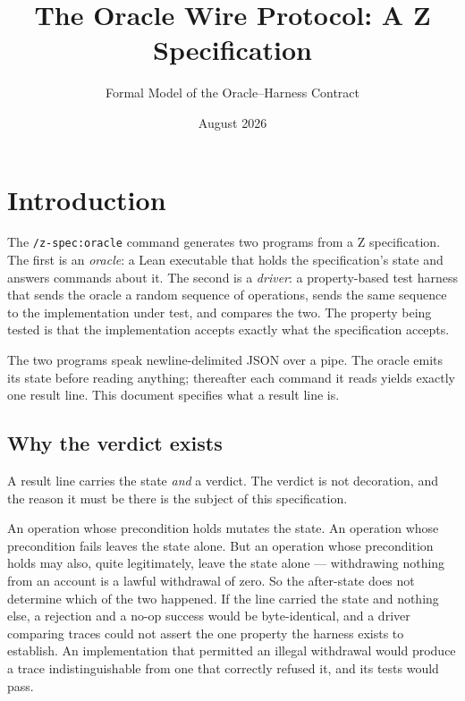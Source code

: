 \documentclass[a4paper,10pt,fleqn]{article}
\begin{document}
\title{The Oracle Wire Protocol: A Z Specification}
\author{Formal Model of the Oracle--Harness Contract}
\date{August 2026}
\maketitle

\tableofcontents
\newpage

\section{Introduction}

The \texttt{/z-spec:oracle} command generates two programs from a Z
specification. The first is an \emph{oracle}: a Lean executable that
holds the specification's state and answers commands about it. The
second is a \emph{driver}: a property-based test harness that sends the
oracle a random sequence of operations, sends the same sequence to the
implementation under test, and compares the two. The property being
tested is that the implementation accepts exactly what the specification
accepts.

The two programs speak newline-delimited JSON over a pipe. The oracle
emits its state before reading anything; thereafter each command it reads
yields exactly one result line. This document specifies what a result
line is.

\subsection{Why the verdict exists}

A result line carries the state \emph{and} a verdict. The verdict is not
decoration, and the reason it must be there is the subject of this
specification.

An operation whose precondition holds mutates the state. An operation
whose precondition fails leaves the state alone. But an operation whose
precondition holds may also, quite legitimately, leave the state alone
--- withdrawing nothing from an account is a lawful withdrawal of zero.
So the after-state does not determine which of the two happened. If the
line carried the state and nothing else, a rejection and a no-op success
would be byte-identical, and a driver comparing traces could not assert
the one property the harness exists to establish. An implementation that
permitted an illegal withdrawal would produce a trace indistinguishable
from one that correctly refused it, and its tests would pass.
\end{document}
